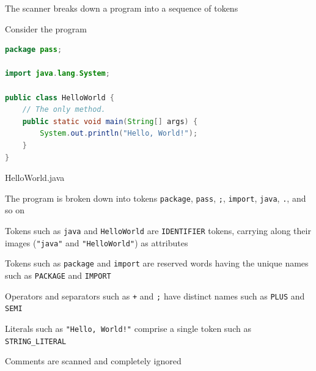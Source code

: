 \documentclass[8pt,a4paper,compress]{beamer}
\begin{document}
\begin{frame}[fragile]
\pause

The scanner breaks down a \jmm program into a sequence of tokens

\pause\bigskip

Consider the program

\pause\smallskip

\begin{tcolorbox}[enhanced,drop shadow southwest,sharp corners,size=fbox,colback=white,fontlower=\small\ttfamily,collower=silver900]

\begin{lstlisting}[language=Java,style=focusin]
package pass;

import java.lang.System;

public class HelloWorld {
    // The only method.
    public static void main(String[] args) {
        System.out.println("Hello, World!");
    }
}
\end{lstlisting}

\tcblower
\begin{minipage}[t][.25cm][t]{\textwidth}
HelloWorld.java
\end{minipage}
\end{tcolorbox}

\pause\smallskip

The program is broken down into tokens \lstinline{package}, \lstinline{pass}, \lstinline{;}, \lstinline{import}, \lstinline{java}, \lstinline{.}, and so on

\pause\bigskip

Tokens such as \lstinline{java} and \lstinline{HelloWorld} are \lstinline{IDENTIFIER} tokens, carrying along their images (\lstinline{"java"} and \lstinline{"HelloWorld"}) as attributes

\pause\bigskip

Tokens such as \lstinline{package} and \lstinline{import} are reserved words having the unique names such as \lstinline{PACKAGE} and \lstinline{IMPORT}

\pause\bigskip

Operators and separators such as \lstinline{+} and \lstinline{;} have distinct names such as \lstinline{PLUS} and \lstinline{SEMI}

\pause\bigskip

Literals such as \lstinline{"Hello, World!"} comprise a single token such as \lstinline{STRING_LITERAL}

\pause\bigskip

Comments are scanned and completely ignored
\end{frame}
\end{document}
